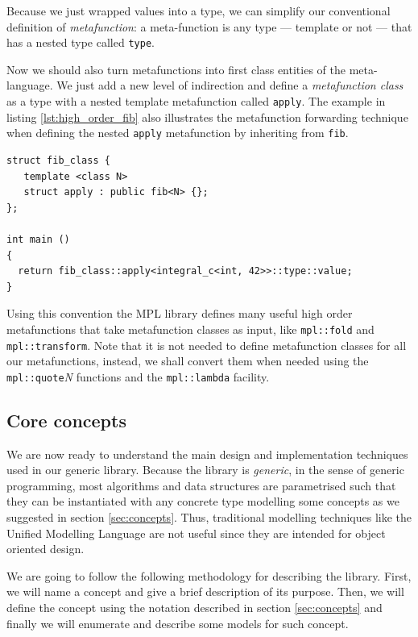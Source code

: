 Because we just wrapped values into a type, we can simplify our
conventional definition of \emph{metafunction}: a meta-function is any
type --- template or not --- that has a nested type called
\texttt{type}.

Now we should also turn metafunctions into first class entities of the
meta-language. We just add a new level of indirection and define a
\emph{metafunction class} as a type with a nested template
metafunction called \texttt{apply}. The example in listing
\ref{lst:high_order_fib} also illustrates the metafunction forwarding
technique when defining the nested \texttt{apply} metafunction by
inheriting from \texttt{fib}.

\begin{lstlisting}[float, caption=Metafunction class for
  computing Fibonacci numbers. We suppose that the previous
  \texttt{fib} definition uses \texttt{integral\_c} to wrap its
  parameters and return types., label=lst:high_order_fib]
struct fib_class { 
   template <class N>
   struct apply : public fib<N> {};
};

int main ()
{
  return fib_class::apply<integral_c<int, 42>>::type::value;
}
\end{lstlisting}

Using this convention the MPL library defines many useful high order
metafunctions that take metafunction classes as input, like
\texttt{mpl::fold} and \texttt{mpl::transform}. Note that it is not
needed to define metafunction classes for all our metafunctions,
instead, we shall convert them when needed using the
\texttt{mpl::quote}\emph{N} functions and the \texttt{mpl::lambda}
facility.

\subsection{Core concepts}
\label{sec:ns-sound-beg}
We are now ready to understand the main design and implementation
techniques used in our generic library. Because the library is
\emph{generic}, in the sense of generic programming, most algorithms
and data structures are parametrised such that they can be
instantiated with any concrete type modelling some concepts as we
suggested in section \ref{sec:concepts}. Thus, traditional modelling
techniques like the Unified Modelling Language are not useful since
they are intended for object oriented design.

We are going to follow the following methodology for describing the
library. First, we will name a concept and give a brief description of
its purpose. Then, we will define the concept using the notation
described in section \ref{sec:concepts} and finally we will enumerate
and describe some models for such concept.


